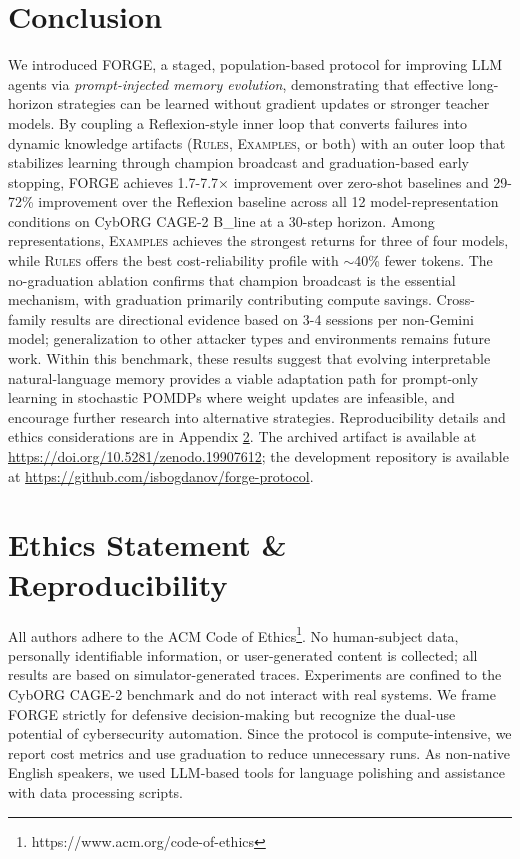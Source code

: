 \documentclass[sigconf]{acmart}
\begin{document}
\section{Conclusion}
We introduced FORGE, a staged, population-based protocol for improving LLM agents via \emph{prompt-injected memory evolution}, demonstrating that effective long-horizon strategies can be learned without gradient updates or stronger teacher models. By coupling a Reflexion-style inner loop that converts failures into dynamic knowledge artifacts (\textsc{Rules}, \textsc{Examples}, or both) with an outer loop that stabilizes learning through champion broadcast and graduation-based early stopping, FORGE achieves 1.7-7.7$\times$ improvement over zero-shot baselines and 29-72\% improvement over the Reflexion baseline across all 12 model-representation conditions on CybORG CAGE-2 B\_line at a 30-step horizon. Among representations, \textsc{Examples} achieves the strongest returns for three of four models, while \textsc{Rules} offers the best cost-reliability profile with $\sim$40\% fewer tokens. The no-graduation ablation confirms that champion broadcast is the essential mechanism, with graduation primarily contributing compute savings. Cross-family results are directional evidence based on 3-4 sessions per non-Gemini model; generalization to other attacker types and environments remains future work. Within this benchmark, these results suggest that evolving interpretable natural-language memory provides a viable adaptation path for prompt-only learning in stochastic POMDPs where weight updates are infeasible, and encourage further research into alternative strategies. Reproducibility details and ethics considerations are in Appendix \ref{app:ethics}. The archived artifact is available at \url{https://doi.org/10.5281/zenodo.19907612}; the development repository is available at \url{https://github.com/isbogdanov/forge-protocol}.






\appendix

\section{Ethics Statement \& Reproducibility}
\label{app:ethics}
All authors adhere to the ACM Code of Ethics\footnote{https://www.acm.org/code-of-ethics}. No human-subject data, personally identifiable information, or user-generated content is collected; all results are based on simulator-generated traces. Experiments are confined to the CybORG CAGE-2 benchmark and do not interact with real systems. We frame FORGE strictly for defensive decision-making but recognize the dual-use potential of cybersecurity automation. Since the protocol is compute-intensive, we report cost metrics and use graduation to reduce unnecessary runs. As non-native English speakers, we used LLM-based tools for language polishing and assistance with data processing scripts.
\end{document}
